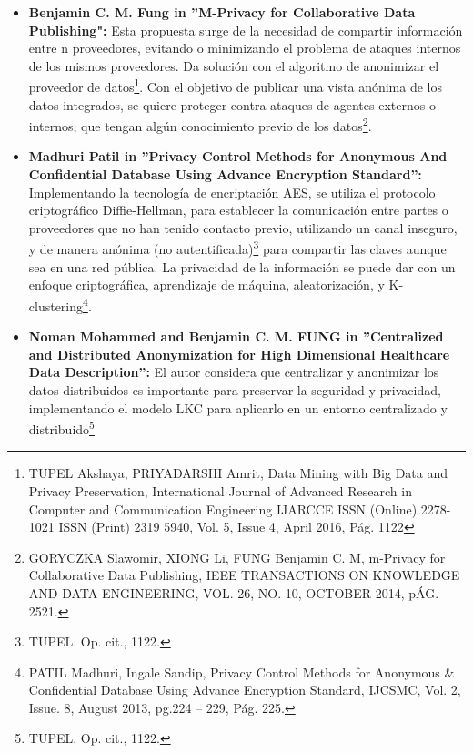 \documentclass[a4paper,openright,12pt]{book}
\theoremstyle{definition}
\theoremstyle{remark}
\begin{document}
\begin{itemize}
	\item \textbf{Benjamin C. M. Fung in ”M-Privacy for Collaborative Data Publishing":} Esta propuesta surge de la necesidad de compartir información entre n proveedores, evitando o minimizando el problema de ataques internos de los mismos proveedores. Da solución con el algoritmo de anonimizar el proveedor de datos\footnote{TUPEL Akshaya, PRIYADARSHI Amrit, Data Mining with Big Data and Privacy Preservation, International Journal of Advanced Research in Computer and Communication Engineering IJARCCE ISSN (Online) 2278-1021 ISSN (Print) 2319 5940,
Vol. 5, Issue 4, April 2016, Pág. 1122}. Con el objetivo de publicar una vista anónima de los datos integrados, se quiere proteger contra ataques de agentes externos o internos, que tengan algún conocimiento previo de los datos\footnote{GORYCZKA Slawomir, XIONG Li, FUNG Benjamin C. M, m-Privacy for Collaborative Data Publishing, IEEE TRANSACTIONS ON KNOWLEDGE AND DATA ENGINEERING, VOL. 26, NO. 10, OCTOBER 2014, pÁG. 2521.}. 
    \item \textbf{Madhuri Patil in ”Privacy Control Methods for Anonymous And Confidential Database Using Advance Encryption Standard”:} Implementando la tecnología de encriptación AES, se utiliza el protocolo criptográfico Diffie-Hellman, para establecer la comunicación entre partes o proveedores que no han tenido contacto previo, utilizando un canal inseguro, y de manera anónima (no autentificada)\footnote{TUPEL. Op. cit., 1122.} para compartir las claves aunque sea en una red pública. La privacidad de la información se puede dar con un enfoque criptográfica, aprendizaje de máquina, aleatorización, y K-clustering\footnote{PATIL Madhuri, Ingale Sandip, Privacy Control Methods for Anonymous \& Confidential Database Using Advance Encryption Standard, IJCSMC, Vol. 2, Issue. 8, August 2013, pg.224 – 229, Pág. 225.}.
    \item \textbf{Noman Mohammed and Benjamin C. M. FUNG in ”Centralized and Distributed Anonymization for High Dimensional Healthcare Data Description”:} El autor considera que centralizar y anonimizar los datos distribuidos es importante para preservar la seguridad y privacidad, implementando el modelo LKC para aplicarlo en un entorno centralizado y distribuido\footnote{TUPEL. Op. cit., 1122.}
\end{itemize}
\end{document}
